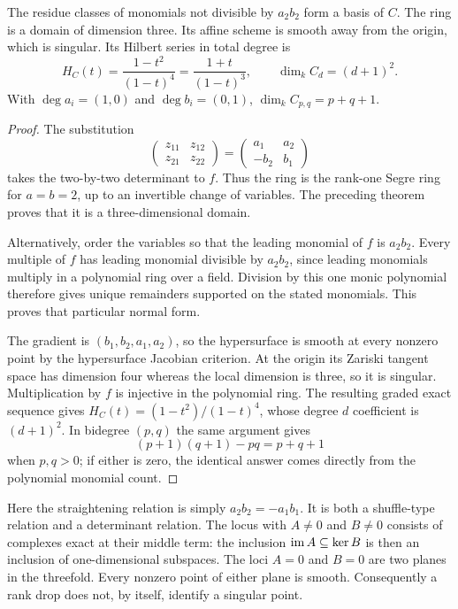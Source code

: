 \begin{proposition}
The residue classes of monomials not divisible by \(a_2b_2\)
form a basis of \(C\).  The ring is a domain of dimension
three.  Its affine scheme is smooth away from the origin,
which is singular.  Its Hilbert series in total degree is
\[
 H_C(t)=\frac{1-t^2}{(1-t)^4}
       =\frac{1+t}{(1-t)^3},
 \qquad \dim_k C_d=(d+1)^2.
\]
With \(\deg a_i=(1,0)\) and \(\deg b_i=(0,1)\),
\(\dim_k C_{p,q}=p+q+1\).
\end{proposition}
\begin{proof}
The substitution
\[
 \begin{pmatrix}z_{11}&z_{12}\\z_{21}&z_{22}\end{pmatrix}
 =
 \begin{pmatrix}a_1&a_2\\-b_2&b_1\end{pmatrix}
\]
takes the two-by-two determinant to \(f\).
Thus the ring is the rank-one Segre ring for \(a=b=2\),
up to an invertible change of variables.  The preceding
theorem proves that it is a three-dimensional domain.

Alternatively, order the variables so that the leading
monomial of \(f\) is \(a_2b_2\).  Every multiple of \(f\)
has leading monomial divisible by \(a_2b_2\), since
leading monomials multiply in a polynomial ring over a
field.  Division by this one monic polynomial therefore
gives unique remainders supported on the stated
monomials.  This proves that particular normal form.

The gradient is
\((b_1,b_2,a_1,a_2)\), so the hypersurface is smooth at
every nonzero point by the hypersurface Jacobian
criterion.  At the origin its Zariski tangent space has
dimension four whereas the local dimension is three,
so it is singular.
Multiplication by \(f\) is injective in the polynomial
ring.  The resulting graded exact sequence gives
\(H_C(t)=(1-t^2)/(1-t)^4\), whose degree \(d\)
coefficient is \((d+1)^2\).  In bidegree \((p,q)\)
the same argument gives
\[
 (p+1)(q+1)-pq=p+q+1
\]
when \(p,q>0\); if either is zero, the identical answer
comes directly from the polynomial monomial count.
\end{proof}

Here the straightening relation is simply
\(a_2b_2=-a_1b_1\).  It is both a shuffle-type relation
and a determinant relation.  The locus with \(A\ne0\)
and \(B\ne0\) consists of complexes exact at their
middle term: the inclusion \(\operatorname{im} A\subseteq\ker B\)
is then an inclusion of one-dimensional subspaces.
The loci \(A=0\) and \(B=0\) are two planes in the
threefold.  Every nonzero point of either plane is
smooth.  Consequently a rank drop does not, by
itself, identify a singular point.

